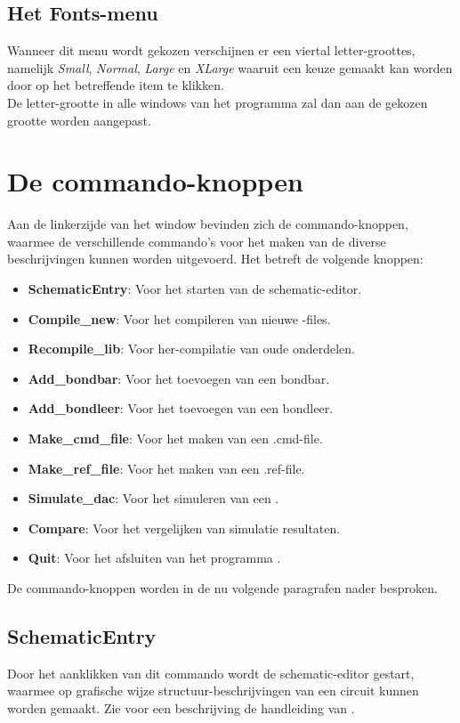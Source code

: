 \subsection{Het Fonts-menu}
Wanneer dit menu wordt gekozen verschijnen er een viertal letter-groottes, namelijk
{\it Small}, {\it Normal}, {\it Large} en {\it XLarge} waaruit een keuze gemaakt kan worden
door op het betreffende item te klikken.\\
De letter-grootte in alle windows van het programma  zal dan
aan de gekozen grootte worden aangepast.

\section{De commando-knoppen}
Aan de linkerzijde van het  window bevinden zich de commando-knoppen,
waarmee de verschillende commando's voor het maken van de diverse beschrijvingen kunnen worden uitgevoerd.
Het betreft de volgende knoppen:
\begin{itemize}
\item {\bf SchematicEntry}: Voor het starten van de schematic-editor.
\item {\bf Compile\_new}: Voor het compileren van nieuwe -files.
\item {\bf Recompile\_lib}: Voor her-compilatie van oude onderdelen.
\item {\bf Add\_bondbar}: Voor het toevoegen van een bondbar.
\item {\bf Add\_bondleer}: Voor het toevoegen van een bondleer.
\item {\bf Make\_cmd\_file}: Voor het maken van een .cmd-file.
\item {\bf Make\_ref\_file}: Voor het maken van een .ref-file.
\item {\bf Simulate\_dac}: Voor het simuleren van een .
\item {\bf Compare}: Voor het vergelijken van simulatie resultaten.
\item {\bf Quit}: Voor het afsluiten van het programma .
\end{itemize}
De commando-knoppen worden in de nu volgende paragrafen nader besproken.

\subsection{SchematicEntry}
Door het aanklikken van dit commando wordt de schematic-editor  gestart,
waarmee op grafische wijze  structuur-beschrijvingen van een
circuit kunnen worden gemaakt.
Zie voor een beschrijving de handleiding van .

